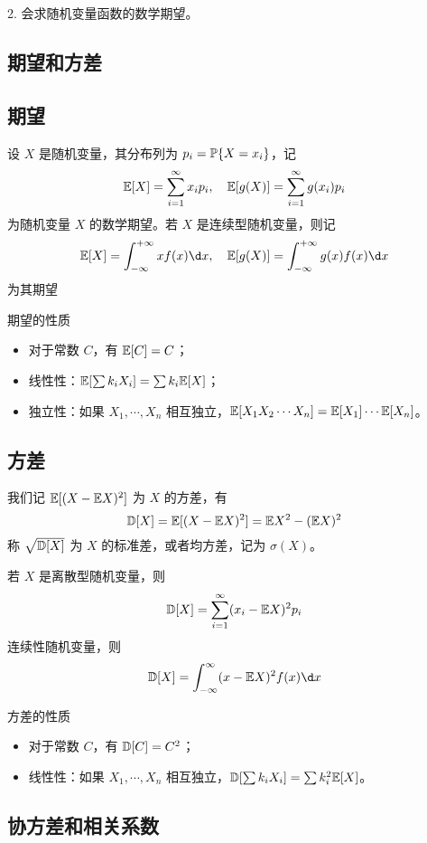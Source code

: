 2. 会求随机变量函数的数学期望。

\subsection{期望和方差}

\subsection*{期望}

设 $X$ 是随机变量，其分布列为 $p_i = \mathbb{P}\{X = x_i\}$，记
\[ \mathbb{E} [X] = \sum_{i=1}^\infty x_i p_i, \quad \mathbb{E}[g(X)] = \sum_{i=1}^\infty g(x_i) p_i \]
为随机变量 $X$ 的数学期望。若 $X$ 是连续型随机变量，则记
\[ \bbE [X] = \int_{-\infty}^{+\infty} x f(x) \d x, \quad \bbE[g(X)] = \int_{-\infty}^{+\infty} g(x) f(x) \d x \]
为其期望

期望的性质
\begin{itemize}
	\item 对于常数 $C$，有 $\mathbb{E}[C] = C$；
	\item 线性性：$\mathbb{E}[\sum k_iX_i] = \sum k_i \mathbb{E} [X]$；
	\item 独立性：如果 $X_1, \cdots, X_n$ 相互独立，$\mathbb{E}[X_1X_2\cdots X_n] = \mathbb{E}[X_1] \cdots \mathbb{E}[X_n]$。
\end{itemize}

\subsection*{方差}

我们记 $\mathbb{E}[(X - \mathbb{E} X)^2]$ 为 $X$ 的方差，有
\[ \mathbb{D} [X] = \mathbb{E}[(X - \mathbb{E} X)^2] = \mathbb{E} X^2 - (\mathbb{E} X)^2 \]
称 $\sqrt{\mathbb{D} [X]}$ 为 $X$ 的标准差，或者均方差，记为 $\sigma(X)$。

若 $X$ 是离散型随机变量，则
\[ \mathbb{D} [X] = \sum_{i=1}^{\infty} (x_i - \mathbb{E} X)^2 p_i \]
连续性随机变量，则
\[ \bbD [X] = \int_{-\infty}^{\infty} (x-\bbE X)^2 f(x) \d x \]

方差的性质
\begin{itemize}
	\item 对于常数 $C$，有 $\mathbb{D}[C] = C^2$；
	\item 线性性：如果 $X_1, \cdots, X_n$ 相互独立，$\mathbb{D}[\sum k_iX_i] = \sum k_i^2 \mathbb{E} [X]$。
\end{itemize}

\subsection{协方差和相关系数}

